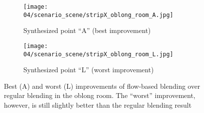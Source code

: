 \begin{figure}
\centering
    \hfill
    \begin{subfigure}[b]{\textwidth}
            \centering
            \texttt{[image: 04/scenario\_scene/stripX\_oblong\_room\_A.jpg]}
            \caption{Synthesized point ``A'' (best improvement)}
    \end{subfigure}
    \hfill

    \hfill
    \begin{subfigure}[b]{\textwidth}
            \centering
            \texttt{[image: 04/scenario\_scene/stripX\_oblong\_room\_L.jpg]}
            \caption{Synthesized point ``L'' (worst improvement)}
    \end{subfigure}
    \hfill
  \caption[Best and worst improvements of flow-based blending over regular blending in the oblong room]{Best (A) and worst (L) improvements of flow-based blending over regular blending in the oblong room. The ``worst'' improvement, however, is still slightly better than the regular blending result} \label{fig:scene_oblong_best_worst}
\end{figure}

